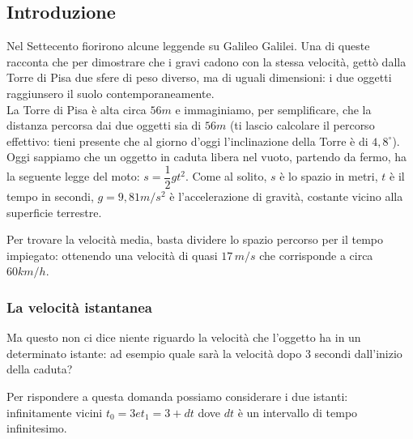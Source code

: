 \subsection{Introduzione}
\label{subsec:differenziazione_introduzione}
Nel Settecento fiorirono alcune leggende su Galileo Galilei. Una di queste 
racconta che per dimostrare che i gravi cadono con la stessa velocità, 
gettò dalla Torre di Pisa due sfere di peso diverso, ma di uguali 
dimensioni: i due oggetti raggiunsero il suolo 
contemporaneamente.\\
La Torre di Pisa è alta circa \(56m\) e immaginiamo, per semplificare, 
che la distanza percorsa dai due oggetti sia di \(56m\) (ti lascio 
calcolare il percorso effettivo: tieni presente che al giorno d'oggi 
l'inclinazione della Torre è di \(4,8^\circ\)).\\
Oggi sappiamo che un oggetto in caduta libera nel vuoto, 
partendo da fermo, ha la seguente legge del moto:
\(s=\dfrac{1}{2}gt^2\). Come al solito, \(s\) è lo spazio in metri, 
\(t\) è il tempo in secondi, \(g=9,81 m/s^2\) è l'accelerazione di 
gravità, costante vicino alla superficie terrestre.

Per trovare la velocità media, basta dividere lo spazio percorso per il 
tempo impiegato: ottenendo una velocità di quasi \(17\,m/s\) che 
corrisponde a circa \(60 km/h\). 

% 

\subsubsection{La velocità istantanea}
\label{subsubsec:differenziazione_velocita_istantanea}

Ma questo non ci dice niente riguardo la velocità che l'oggetto ha in un 
determinato istante: ad esempio quale sarà la velocità 
dopo 3 secondi dall'inizio della caduta?

Per rispondere a questa domanda possiamo considerare i due istanti: 
infinitamente vicini \(t_0 = 3 e t_1 = 3 + dt\) dove \(dt\) è un intervallo 
di tempo infinitesimo.

